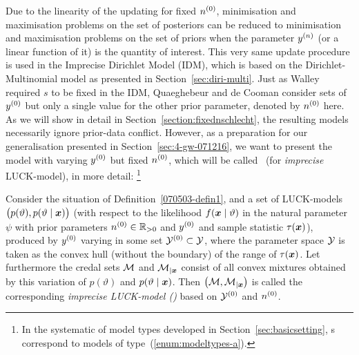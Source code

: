 Due to the linearity of the updating for fixed $n^{(0)}$, minimisation and maximisation problems on the set of
posteriors can be reduced to minimisation and maximisation problems
on the set of priors when the parameter $y^{(n)}$ (or a linear function of it) is the quantity of interest. This
very same update procedure is used in the Imprecise Dirichlet Model
(IDM), which is based on the Dirichlet-Multinomial model as
presented in Section~\ref{sec:diri-multi}.
Just as Walley required $s$ to be fixed in the IDM, Quaeghebeur
and de Cooman consider sets of $y^{(0)}$ but only a single value for
the other prior parameter, denoted by $n^{(0)}$ here. As we will show
in detail in Section~\ref{section:fixednschlecht}, the resulting models
necessarily ignore prior-data conflict. However, as a
preparation for our generalisation presented in
Section~\ref{sec:4-gw-071216}, we want to present the model with
varying $y^{(0)}$ but fixed $n^{(0)}$, which will be called \ymodel\ (for
\emph{imprecise} LUCK-model), in more detail:%
\footnote{In the systematic of model types developed in Section~\ref{sec:basicsetting},
\ymodel s correspond to models of type~(\ref{enum:modeltypes-a}).}
%
%
%
\begin{definition}\label{071219-def2}
Consider the situation of Definition~\ref{070503-defin1},
and a set of LUCK-models $\big(p(\vartheta),p(\vartheta\mid{\bm x})\big)$
(with respect to the likelihood $f({\bm x}\mid\vartheta)$ in the natural
parameter $\psi$ with prior parameters $n^{(0)} \in \mathbb{R}_{>0}$ and
$y^{(0)}$ and sample statistic $\tau({\bm x})$), produced by $y^{(0)}$
varying in some set $\mathcal{Y}^{(0)} \subset \mathcal{Y}$, where the
parameter space $\mathcal{Y}$ is taken as the convex hull (without
the boundary) of the range of $\tau({\bm x})$. Let furthermore the credal
sets ${\cal M}$ and ${\cal M}_{|{\bm x}}$ consist of all convex mixtures
obtained by this variation of $p(\vartheta)$ and $p(\vartheta\mid{\bm x})$.
Then $\big({\cal M}, {\cal M}_{|{\bm x}}\big)$ is called the corresponding
\emph{imprecise LUCK-model (\ymodel)} based on $\mathcal{Y}^{(0)}$ and $n^{(0)}$.
\end{definition}

